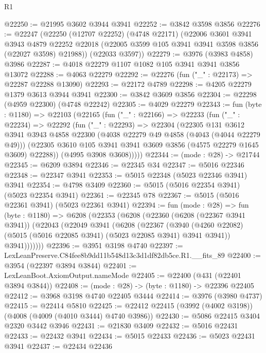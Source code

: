 \begin{lexlean}{R1}
\begin{coremodule}
@22250 := @21995 @3602 @3944 @3941
@22252 := @3842 @3598 @3856
@22276 := @22247
    (@22250
      (@12707 @22252)
      (@4748 @22171)
      (@22006
        @3601
        @3941
        @3943
        @4879
        @22252
        @22018
        (@22005 @3599 @105 @3941 @3941 @3598 @3856 (@22027 @3598) @21988))
      (@22033 @3597))
@22279 := @3976 (@3983 @4858) @3986
@22287 := @4018 @22279 @1107 @1082 @105 @3941 @3941 @3856 @13072
@22288 := @4063 @22279
@22292 := @22276 (fun ("_" : @22173) => @22287 @22288 @13090)
@22293 := @22172 @4789
@22298 := @4205 @22279 @1379 @3613 @3944 @3941
@22300 := @3842 @3609 @3856
@22304 := @22298 (@4959 @22300) (@4748 @22242)
@22305 := @4029 @22279
@22343 := fun (byte : @1180) =>
  @22103
    (@22165
      (fun ("_" : @22166) =>
      @22233
        (fun ("_" : @22234) =>
        @22292
          (fun ("_" : @22293) =>
          @22304
            (@22305
              @131
              @3612
              @3941
              @3943
              @4858
              @22300
              (@4038 @22279 @49 @4858 (@4043 (@4044 @22279 @49)))
              (@22305 @3610 @105 @3941 @3941 @3609 @3856 (@4575 @22279 @1645 @3609) @22288))
            (@4995 @3908 @3608)))))
@22344 := (mode : @28) -> @21744
@22345 := @6209 @3894
@22346 := @22345 @34
@22347 := @5016 @22346
@22348 := @22347 @3941
@22353 := @5015 @22348 (@5023 @22346 @3941) @3941
@22354 := @4798 @3409
@22360 := @5015 (@5016 @22354 @3941) (@5023 @22354 @3941)
@22361 := @22345 @78
@22367 := @5015 (@5016 @22361 @3941) (@5023 @22361 @3941)
@22394 := fun (mode : @28) =>
  fun (byte : @1180) =>
  @6208
    (@22353
      (@6208
        (@22360
          (@6208 (@22367 @3941 @3941))
          (@22043
            (@22049
              @3941
              (@6208
                (@22367
                  (@3940
                    (@4260 @22082)
                    (@5015 (@5016 @22085 @3941) (@5023 @22085 @3941) @3941 @3941))
                  @3941)))))))
@22396 := @3951 @3198 @4740
@22397 := LexLeanPreserve.C84fee8b9dd11b548d13c3d1df82db5ce.R1.__fits_89
@22400 := @3954 (@22397 @3894 @3844)
@22401 := LexLeanBoot.AxiomOutput.nameMode
@22405 := @22400 (@431 (@22401 @3894 @3844))
@22408 := (mode : @28) -> (byte : @1180) -> @22396 @22405
@22412 := @3968 @3198 @4740 @22405 @3444
@22414 := @3976 (@3980 @4737)
@22415 := @22414 @5810
@22425 := @22412 @22415 (@3992 (@4002 @3198)) (@4008 (@4009 (@4010 @3444) @4740 @3986))
@22430 := @5086 @22415 @3404 @2320 @3442 @3946
@22431 := @21830 @3409
@22432 := @5016 @22431
@22433 := @22432 @3941
@22434 := @5015 @22433
@22436 := @5023 @22431 @3941
@22437 := @22434 @22436

\end{coremodule}
\end{lexlean}
